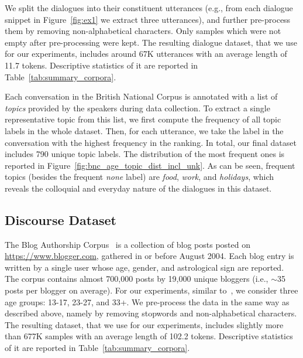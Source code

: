 We split the dialogues into their constituent utterances (e.g., from each dialogue snippet in Figure~\ref{fig:ex1} we extract three utterances), and further pre-process them by removing non-alphabetical characters.
Only samples which were not empty after pre-processing were kept.
The resulting dialogue dataset, that we use for our experiments, includes around 67K utterances with an average length of 11.7 tokens. Descriptive statistics of it are reported in Table~\ref{tab:summary_corpora}.

Each conversation in the British National Corpus is annotated with a list of \emph{topics} provided by the speakers during data collection. 
To extract a single representative topic from this list, we first compute the frequency of all topic labels in the whole dataset. Then, for each utterance, we take the label in the conversation with the highest frequency in the ranking.
In total, our final dataset includes 790 unique topic labels. The distribution of the most frequent ones is reported in Figure~\ref{fig:bnc_age_topic_dist_incl_unk}. As can be seen, frequent topics (besides the frequent \emph{none} label) are \emph{food}, \emph{work}, and \emph{holidays}, which reveals the colloquial and everyday nature of the dialogues in this dataset.

\subsection{Discourse Dataset}

The Blog Authorship Corpus~\cite{schler2006effects} is a collection of blog posts
posted on \url{https://www.blogger.com}, gathered in or before August 2004. %
Each blog entry is
written by a single user
whose age, gender, and astrological sign are reported.
The corpus contains almost 700,000 posts by 19,000 unique bloggers (i.e., $\sim$35 posts per blogger on average).
For our experiments, similar to~\citet{schler2006effects},
we consider three age groups: 13-17, 23-27, and 33+. We pre-process the data in the same way as described above, namely by removing stopwords and non-alphabetical characters. The resulting dataset, that we use for our experiments, includes slightly more than 677K samples with an average length of 102.2 tokens. Descriptive statistics of it are reported in Table~\ref{tab:summary_corpora}. 


